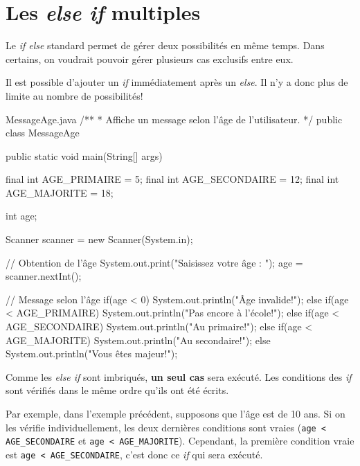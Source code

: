 \documentclass[12pt]{report}
\begin{document}
\section{Les \textit{else if} multiples}

Le \textit{if else} standard permet de gérer deux possibilités en même temps. Dans certains, on voudrait pouvoir gérer plusieurs cas exclusifs entre eux.

Il est possible d'ajouter un \textit{if} immédiatement après un \textit{else}. Il n'y a donc plus de limite au nombre de possibilités!

\begin{MyTCB}{MessageAge.java}
/**
 * Affiche un message selon l'âge de l'utilisateur.
 */
public class MessageAge {

	public static void main(String[] args) {

		final int AGE_PRIMAIRE = 5;
		final int AGE_SECONDAIRE = 12;
		final int AGE_MAJORITE = 18;		
		
		int age;
		
		Scanner scanner = new Scanner(System.in);
		
		// Obtention de l'âge
		System.out.print("Saisissez votre âge : ");
		age = scanner.nextInt();
		
		// Message selon l'âge
		if(age < 0) {
			System.out.println("Âge invalide!");
		}
		else if(age < AGE_PRIMAIRE) {
			System.out.println("Pas encore à l'école!");
		}
		else if(age < AGE_SECONDAIRE) {
			System.out.println("Au primaire!");
		}
		else if(age < AGE_MAJORITE) {
			System.out.println("Au secondaire!");
		}
		else {
			System.out.println("Vous êtes majeur!");
		}
	}
}
\end{MyTCB}

Comme les \textit{else if} sont imbriqués, \textbf{un seul cas} sera exécuté. Les conditions des \textit{if} sont vérifiés dans le même ordre qu'ils ont été écrits. 

Par exemple, dans l'exemple précédent, supposons que l'âge est de 10 ans. Si on les vérifie individuellement, les deux dernières conditions sont vraies (\verb|age < AGE_SECONDAIRE| et \verb|age < AGE_MAJORITE|). Cependant, la première condition vraie est \verb|age < AGE_SECONDAIRE|, c'est donc ce \textit{if} qui sera exécuté.
\end{document}
